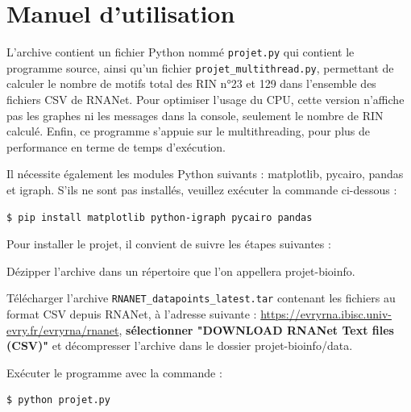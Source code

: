 \documentclass[11pt,a4paper]{article}
\begin{document}
\section{Manuel d'utilisation}
L'archive contient un fichier Python nommé \texttt{projet.py} qui contient le programme source, ainsi qu'un fichier \texttt{projet\_multithread.py}, permettant de calculer le nombre de motifs total des RIN n°23 et 129 dans l'ensemble des fichiers CSV de RNANet. Pour optimiser l'usage du CPU, cette version n'affiche pas les graphes ni les messages dans la console, seulement le nombre de RIN calculé. Enfin, ce programme s'appuie sur le multithreading, pour plus de performance en terme de temps d'exécution.


\noindent Il nécessite également les modules Python suivants : matplotlib, pycairo, pandas et igraph. S'ils ne sont pas installés, veuillez exécuter la commande ci-dessous :
\begin{lstlisting}[language=Bash]
$ pip install matplotlib python-igraph pycairo pandas
\end{lstlisting} \eb

Pour installer le projet, il convient de suivre les étapes suivantes :
\bn \item Dézipper l'archive dans un répertoire que l'on appellera projet-bioinfo.
\item Télécharger l'archive \texttt{RNANET\_datapoints\_latest.tar} contenant les fichiers au format CSV depuis RNANet, à l'adresse suivante : \url{https://evryrna.ibisc.univ-evry.fr/evryrna/rnanet}, {\color{blue} \textbf{sélectionner "DOWNLOAD RNANet Text files (CSV)"}} et décompresser l'archive dans le dossier projet-bioinfo/data.
\item Exécuter le programme avec la commande :
\begin{lstlisting}[language=Bash]
$ python projet.py
\end{lstlisting} \en
\end{document}

